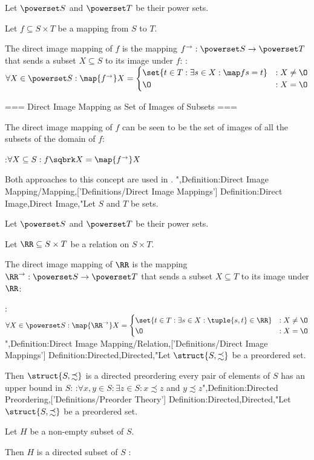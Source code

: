 Let $\powerset S$ and $\powerset T$ be their power sets.

Let $f \subseteq S \times T$ be a mapping from $S$ to $T$.


The direct image mapping of $f$ is the mapping $f^\to: \powerset S \to \powerset T$ that sends a subset $X \subseteq S$ to its image under $f$:
:$\forall X \in \powerset S: \map {f^\to} X = \begin {cases} \set {t \in T: \exists s \in X: \map f s = t} & : X \ne \O \\ \O & : X = \O \end {cases}$


=== Direct Image Mapping as Set of Images of Subsets ===



The direct image mapping of $f$ can be seen to be the set of images of all the subsets of the domain of $f$:

:$\forall X \subseteq S: f \sqbrk X = \map {f^\to} X$


Both approaches to this concept are used in .
",Definition:Direct Image Mapping/Mapping,['Definitions/Direct Image Mappings']
Definition:Direct Image,Direct Image,"Let $S$ and $T$ be sets.

Let $\powerset S$ and $\powerset T$ be their power sets.

Let $\RR \subseteq S \times T$ be a relation on $S \times T$.


The direct image mapping of $\RR$ is the mapping $\RR^\to: \powerset S \to \powerset T$ that sends a subset $X \subseteq T$ to its image under $\RR$:

:$\forall X \in \powerset S: \map {\RR^\to} X = \begin {cases} \set {t \in T: \exists s \in X: \tuple {s, t} \in \RR} & : X \ne \O \\ \O & : X = \O \end {cases}$",Definition:Direct Image Mapping/Relation,['Definitions/Direct Image Mappings']
Definition:Directed,Directed,"Let $\struct {S, \precsim}$ be a preordered set.


Then $\struct {S, \precsim}$ is a directed preordering  every pair of elements of $S$ has an upper bound in $S$:
:$\forall x, y \in S: \exists z \in S: x \precsim z$ and $y \precsim z$",Definition:Directed Preordering,['Definitions/Preorder Theory']
Definition:Directed,Directed,"Let $\struct {S, \precsim}$ be a preordered set.

Let $H$ be a non-empty subset of $S$.

Then $H$ is a directed subset of $S$ :

